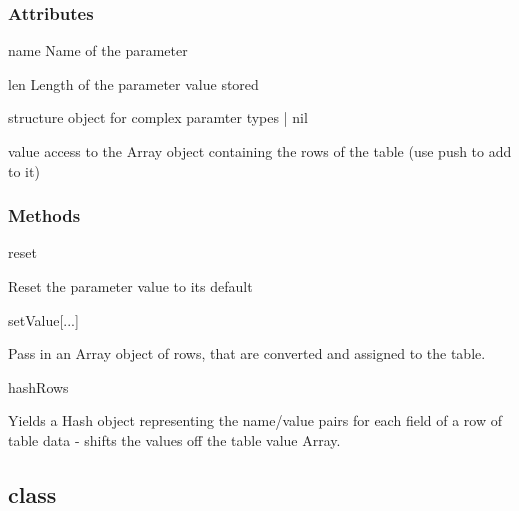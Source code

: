 \documentclass{howto}
\begin{document}
\subsubsection{Attributes \label{tabattrs}}

\begin{memberdesc}[tab]{name}
    Name of the parameter
\end{memberdesc}

\begin{memberdesc}[parm]{len}
     Length of the parameter value stored
\end{memberdesc}

\begin{memberdesc}[parm]{structure}
      object for complex paramter types | nil
\end{memberdesc}

\begin{memberdesc}[parm]{value}
     access to the Array object containing the rows of the table (use push to add to it)
\end{memberdesc}


\subsubsection{Methods \label{tabmeths}}

\begin{methoddesc}[parm]{reset}{}

Reset the parameter value to its default

\end{methoddesc}


\begin{methoddesc}[parm]{setValue}{[...]}

Pass in an Array object of rows, that are converted and assigned to the table.

\end{methoddesc}


\begin{methoddesc}[parm]{hashRows}{}

Yields a Hash object representing the name/value pairs for each
field of a row of table data - shifts the values off the table value Array.

\end{methoddesc}


\subsection{class  \label{classstruct}}
\end{document}
